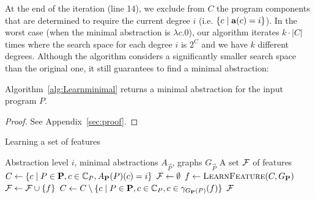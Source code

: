 At the end of the iteration (line 14), we exclude from $C$ the program components that are determined to require the current degree $i$ (i.e. $\{ c \mid {\bf a}(c) = i \}$).
In the worst case (when the minimal abstraction is $\lambda c.0$), our algorithm iterates
$k\cdot |C|$ times where the search space for each degree $i$ is
$2^C$ and we have $k$ different degrees.
Although the algorithm considers a significantly smaller search space than the original one, it still
guarantees to find a minimal abstraction:
\begin{theorem}\label{THM:REDUCESPACE}
Algorithm~\ref{alg:Learnminimal} returns a minimal abstraction for the input program $P$.
\end{theorem}
\begin{proof}
See Appendix~\ref{sec:proof}.
\end{proof}



\begin{algorithm}[t]
	\caption{Learning a set of features}\label{alg:learnFeatures}%
	\begin{algorithmic}[1]
		\Require Abstraction level $i$, minimal abstractions $A_\vec{P}$, graphs $G_\vec{P}$
		\Ensure A set $\mathcal{F}$ of features
		\State
		$C \gets \{c \mid P \in \mathbf{P}, c \in \mathbb{C}_P, A_{\mathbf{P}}(P)(c) = i\}$
		\State
		$\mathcal{F} \gets \emptyset$
                \State $f \gets {\textsc{LearnFeature}}(C,G_{\mathbf{P}})$ %
                \State $\mathcal{F} \gets \mathcal{F} \cup \{ f \}$
                \State $C \gets C \setminus  \{c \mid P\in\mathbf{P}, c\in \mathbb{C}_P, c \in \gamma_{G_{\mathbf{P}}(P)}(f) \}$
                \EndWhile
                \State \Return $\mathcal{F}$
		\EndProcedure
	\end{algorithmic}
\end{algorithm}

